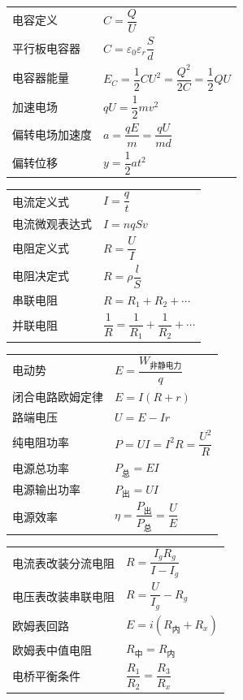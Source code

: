 \begin{tabularx}{\columnwidth}{XX}
  电容定义 & $C=\dfrac{Q}{U}$ \\
  平行板电容器 & $C=\varepsilon_0\varepsilon_r\dfrac{S}{d}$ \\
  电容器能量 & $E_C=\dfrac12CU^2=\dfrac{Q^2}{2C}=\dfrac12QU$ \\
  加速电场 & $qU=\dfrac12mv^2$ \\
  偏转电场加速度 & $a=\dfrac{qE}{m}=\dfrac{qU}{md}$ \\
  偏转位移 & $y=\dfrac12at^2$ \\
\end{tabularx}
\medskip

\begin{tabularx}{\columnwidth}{XX}
  电流定义式 & $I=\dfrac{q}{t}$ \\
  电流微观表达式 & $I=nqSv$ \\
  电阻定义式 & $R=\dfrac{U}{I}$ \\
  电阻决定式 & $R=\rho\dfrac{l}{S}$ \\
  串联电阻 & $R=R_1+R_2+\cdots$ \\
  并联电阻 & $\dfrac1R=\dfrac1{R_1}+\dfrac1{R_2}+\cdots$ \\
\end{tabularx}
\medskip

\begin{tabularx}{\columnwidth}{XX}
  电动势 & $E=\dfrac{W_{\text{非静电力}}}{q}$ \\
  闭合电路欧姆定律 & $E=I(R+r)$ \\
  路端电压 & $U=E-Ir$ \\
  纯电阻功率 & $P=UI=I^2R=\dfrac{U^2}{R}$ \\
  电源总功率 & $P_{\text{总}}=EI$ \\
  电源输出功率 & $P_{\text{出}}=UI$ \\
  电源效率 & $\eta=\dfrac{P_{\text{出}}}{P_{\text{总}}}=\dfrac{U}{E}$ \\
\end{tabularx}
\medskip

\begin{tabularx}{\columnwidth}{XX}
  电流表改装分流电阻 & $R=\dfrac{I_gR_g}{I-I_g}$ \\
  电压表改装串联电阻 & $R=\dfrac{U}{I_g}-R_g$ \\
  欧姆表回路 & $E=i(R_{\text{内}}+R_x)$ \\
  欧姆表中值电阻 & $R_{\text{中}}=R_{\text{内}}$ \\
  电桥平衡条件 & $\dfrac{R_1}{R_2}=\dfrac{R_3}{R_x}$ \\
\end{tabularx}
\medskip

